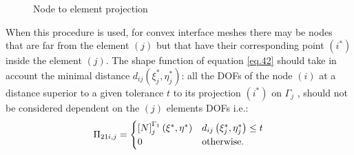         \begin{figure}[!ht]
          \caption{Node to element projection}
          \label{fig.8}
        \end{figure}
     When this procedure is used, for convex interface meshes there may be nodes that are far from the element $(j)$ but  that have their corresponding point $(i^*)$ inside the element $(j)$. The shape function of equation \ref{eq.42} should take in account the minimal distance $d_{ij}\left(\xi^*_j,\eta^*_j \right)$: all the DOFs of the node $(i)$ at a distance superior to a given tolerance $t$ to its projection  $ (i^*) $ on $ \Gamma_j $ , should not be considered dependent on the $ (j) $ elements DOFs i.e.:
     \begin{equation}
     \label{eq.46}
     \Pi_{21i,j}=\begin{cases}\left[{N}\right]_{j}^{\Gamma_1}\left(\xi^*,\eta^* \right) & d_{ij}\left(\xi^*_j,\eta^*_j \right)\leq t\\
     0 & \text{otherwise}.
     \end{cases}
     \end{equation}
